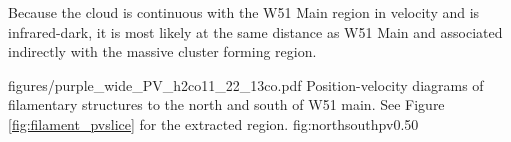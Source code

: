 Because the cloud is continuous with the W51 Main region in velocity and is
infrared-dark, it is most likely at the same distance as W51 Main and
associated indirectly with the massive cluster forming region.

\Figure
{figures/purple_wide_PV_h2co11_22_13co.pdf}
{Position-velocity diagrams of filamentary structures to the north and south of W51 main.
See Figure \ref{fig:filament_pvslice} for the extracted region.}
{fig:northsouthpv}{0.5}{0}


